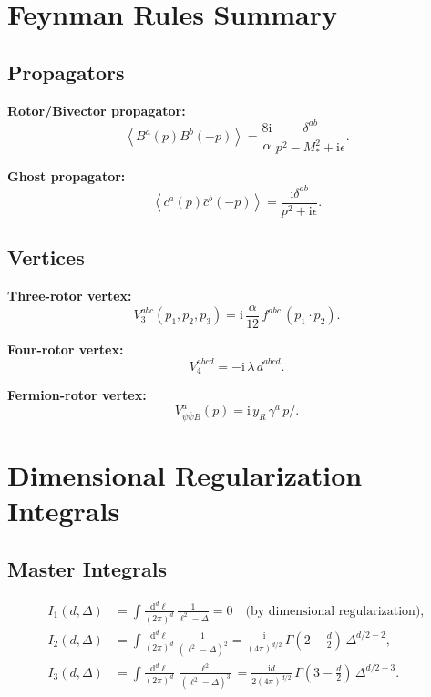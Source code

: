 \documentclass[11pt,a4paper]{article}
\numberwithin{equation}{section}
\theoremstyle{plain}
\theoremstyle{definition}
\theoremstyle{remark}
\newcommand{\dd}{\mathrm{d}}
\newcommand{\ii}{\mathrm{i}}
\newcommand{\avg}[1]{\left\langle #1 \right\rangle}
\begin{document}
\section{Feynman Rules Summary}\label{app:feynman}

\subsection{Propagators}

\textbf{Rotor/Bivector propagator:}
\begin{equation}
\avg{B^a(p)B^b(-p)} = \frac{8\ii}{\alpha}\,\frac{\delta^{ab}}{p^2 - M_*^2 + \ii\epsilon}.
\label{eq:prop-summary}
\end{equation}

\textbf{Ghost propagator:}
\begin{equation}
\avg{c^a(p)\bar c^b(-p)} = \frac{\ii\delta^{ab}}{p^2+\ii\epsilon}.
\label{eq:ghost-prop-summary}
\end{equation}

\subsection{Vertices}

\textbf{Three-rotor vertex:}
\begin{equation}
V_3^{abc}(p_1,p_2,p_3) = \ii\,\frac{\alpha}{12}\,f^{abc}\,(p_1\cdot p_2).
\label{eq:V3-summary}
\end{equation}

\textbf{Four-rotor vertex:}
\begin{equation}
V_4^{abcd} = -\ii\,\lambda\,d^{abcd}.
\label{eq:V4-summary}
\end{equation}

\textbf{Fermion-rotor vertex:}
\begin{equation}
V_{\psi\bar\psi B}^a(p) = \ii\,y_R\,\gamma^a\,p\!\!\!/.
\label{eq:V-fermion-summary}
\end{equation}

\section{Dimensional Regularization Integrals}\label{app:integrals}

\subsection{Master Integrals}

\begin{align}
I_1(d,\Delta) &= \int \frac{\dd^d \ell}{(2\pi)^d}\,\frac{1}{\ell^2-\Delta} = 0 \quad\text{(by dimensional regularization)}, \label{eq:I1-master}\\
I_2(d,\Delta) &= \int \frac{\dd^d \ell}{(2\pi)^d}\,\frac{1}{(\ell^2-\Delta)^2} = \frac{\ii}{(4\pi)^{d/2}}\,\Gamma\left(2-\frac{d}{2}\right)\,\Delta^{d/2-2}, \label{eq:I2-master}\\
I_3(d,\Delta) &= \int \frac{\dd^d \ell}{(2\pi)^d}\,\frac{\ell^2}{(\ell^2-\Delta)^3} = \frac{\ii d}{2(4\pi)^{d/2}}\,\Gamma\left(3-\frac{d}{2}\right)\,\Delta^{d/2-3}. \label{eq:I3-master}
\end{align}
\end{document}
